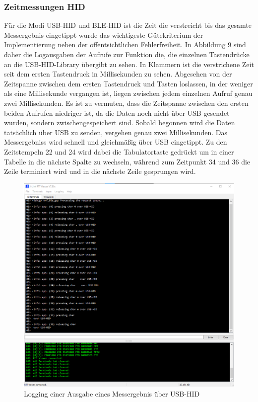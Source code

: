 \subsubsection{Zeitmessungen HID}
Für die Modi USB-HID und BLE-HID ist die Zeit die verstreicht bis das gesamte Messergebnis eingetippt wurde das wichtigeste Gütekriterium der Implementierung neben der offentsichtlichen Fehlerfreiheit. In Abbildung 9 sind daher die Logausgaben der Aufrufe zur Funktion die, die einzelnen Tastendrücke an die USB-HID-Library übergibt zu sehen. In Klammern ist die verstrichene Zeit seit dem ersten Tastendruck in Millisekunden zu sehen. Abgesehen von der Zeitspanne zwischen dem ersten Tastendruck und Tasten loslassen, in der weniger als eine Millisekunde vergangen ist, liegen zwischen jedem einzelnen Aufruf genau zwei Millisekunden. Es ist zu vermuten, dass die Zeitspanne zwischen den ersten beiden Aufrufen niedriger ist, da die Daten noch nicht über USB gesendet wurden, sondern zwischengespeichert sind. Sobald begonnen wird die Daten tatsächlich über USB zu senden, vergehen genau zwei Millisekunden. Das Messergebniss wird schnell und gleichmäßig über USB eingetippt. Zu den Zeitstempeln 22 und 24 wird dabei die Tabulatortaste gedrückt um in einer Tabelle in die nächste Spalte zu wechseln, während zum Zeitpunkt 34 und 36 die Zeile terminiert wird und in die nächste Zeile gesprungen wird.
\begin{figure}[H] 
	\centering
	\includegraphics[width=\textwidth]{figures/USBHID.png}
	\caption{Logging einer Ausgabe eines Messergebnis über USB-HID}
\end{figure}

